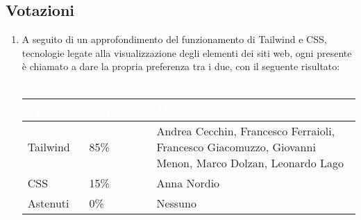 \subsection{Votazioni} \label{subsec:resvotazione}
\begin{enumerate}
    \item A seguito di un approfondimento del funzionamento di Tailwind e CSS, tecnologie legate alla visualizzazione degli elementi dei siti web, ogni presente è chiamato a dare la propria preferenza tra i due, con il seguente risultato:
 \\\\
        \begingroup
            \setlength{\tabcolsep}{10pt}
            \renewcommand{\arraystretch}{1.5}
            \begin{tabularx}{0.93\textwidth}{| l | l | X |}
                 \hline
                 \rowcolor{headerrow}\textbf{\textcolor{white}{Proposta}} & \textbf{\textcolor{white}{Sommario}} & \textbf{\textcolor{white}{Mittente}} \\
                 \hline
                 Tailwind & 85\%  & Andrea Cecchin, Francesco Ferraioli, Francesco Giacomuzzo, Giovanni Menon, Marco Dolzan, Leonardo Lago \\
                 \hline
                 CSS & 15\% &  Anna Nordio\\
                 \hline
                 Astenuti & 0\% & Nessuno \\
                 \hline
            \end{tabularx}
        \endgroup
\end{enumerate}

